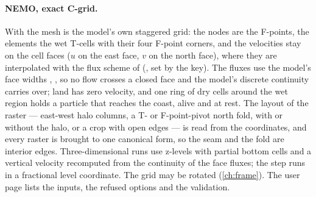 \paragraph{NEMO, exact C-grid.} With  the mesh is the model's own
staggered grid: the nodes are the F-points, the elements the wet T-cells with their four F-point
corners, and the velocities stay on the cell faces ($u$ on the east face, $v$ on the north face), where
they are interpolated with the flux scheme of \citet{delandmeter2019parcels} (,
set by the key). The fluxes use the model's face widths , , so no flow crosses a
closed face and the model's discrete continuity carries over; land has zero velocity, and one ring of
dry cells around the wet region holds a particle that reaches the coast, alive and at rest. The layout
of the raster --- east-west halo columns, a T- or F-point-pivot north fold, with or without the halo, or
a crop with open edges --- is read from the coordinates, and every raster is brought to one canonical
form, so the seam and the fold are interior edges. Three-dimensional runs use z-levels with partial
bottom cells and a vertical velocity recomputed from the continuity of the face fluxes; the step runs in
a fractional level coordinate. The grid may be rotated (\cref{ch:frame}). The user page
 lists the inputs, the refused options and the validation.

